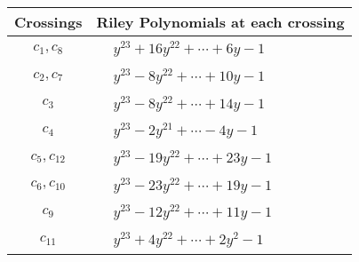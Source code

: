\documentclass[1p]{elsarticle_modified}
\theoremstyle{definition}
\begin{document}
\begin{tabular}{m{50pt}|m{274pt}}
Crossings & \hspace{64pt}Riley Polynomials at each crossing \\
\hline $$\begin{aligned}c_{1},c_{8}\end{aligned}$$&$\begin{aligned}
&y^{23}+16 y^{22}+\cdots+6 y-1
\end{aligned}$\\
\hline $$\begin{aligned}c_{2},c_{7}\end{aligned}$$&$\begin{aligned}
&y^{23}-8 y^{22}+\cdots+10 y-1
\end{aligned}$\\
\hline $$\begin{aligned}c_{3}\end{aligned}$$&$\begin{aligned}
&y^{23}-8 y^{22}+\cdots+14 y-1
\end{aligned}$\\
\hline $$\begin{aligned}c_{4}\end{aligned}$$&$\begin{aligned}
&y^{23}-2 y^{21}+\cdots-4 y-1
\end{aligned}$\\
\hline $$\begin{aligned}c_{5},c_{12}\end{aligned}$$&$\begin{aligned}
&y^{23}-19 y^{22}+\cdots+23 y-1
\end{aligned}$\\
\hline $$\begin{aligned}c_{6},c_{10}\end{aligned}$$&$\begin{aligned}
&y^{23}-23 y^{22}+\cdots+19 y-1
\end{aligned}$\\
\hline $$\begin{aligned}c_{9}\end{aligned}$$&$\begin{aligned}
&y^{23}-12 y^{22}+\cdots+11 y-1
\end{aligned}$\\
\hline $$\begin{aligned}c_{11}\end{aligned}$$&$\begin{aligned}
&y^{23}+4 y^{22}+\cdots+2 y^2-1
\end{aligned}$\\
\hline
\end{tabular}\\~\\
\end{document}
